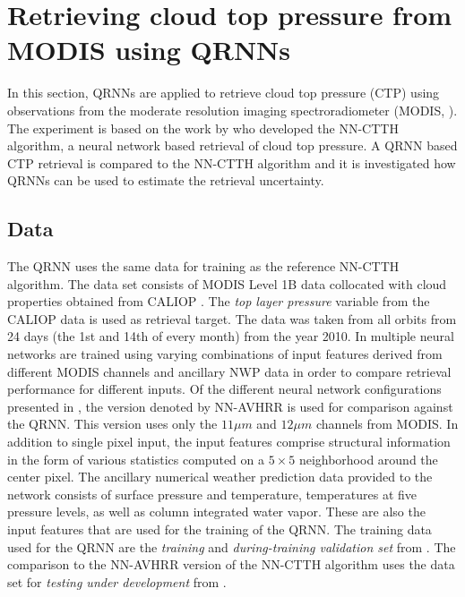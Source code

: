 \documentclass[journal abbreviation, manuscript]{copernicus}
\begin{document}
\section{Retrieving cloud top pressure from MODIS using QRNNs}
\label{sec:ctp}

In this section, QRNNs are applied to retrieve cloud top pressure (CTP) using
observations from the moderate resolution imaging spectroradiometer (MODIS,
\citet{modis}). The experiment is based on the work by \cite{hakansson} who
developed the NN-CTTH algorithm, a neural network based retrieval of cloud top
pressure. A QRNN based CTP retrieval is compared to the NN-CTTH algorithm and it
is investigated how QRNNs can be used to estimate the retrieval uncertainty.

\subsection{Data}

The QRNN uses the same data for training as the reference NN-CTTH algorithm. The
data set consists of MODIS Level 1B data \citep{myd021km, myd03} collocated with
cloud properties obtained from CALIOP \citep{calipso}. The \textit{top layer
  pressure} variable from the CALIOP data is used as retrieval target. The data
was taken from all orbits from 24 days (the 1st and 14th of every month) from
the year 2010. In \citet{hakansson} multiple neural networks are trained using
varying combinations of input features derived from different MODIS channels and
ancillary NWP data in order to compare retrieval performance for different
inputs. Of the different neural network configurations presented in
\citet{hakansson}, the version denoted by NN-AVHRR is used for comparison
against the QRNN. This version uses only the $11 \unit{\mu m}$ and $12\unit{\mu
  m}$ channels from MODIS. In addition to single pixel input, the input features
comprise structural information in the form of various statistics computed on a
$5 \times 5$ neighborhood around the center pixel. The ancillary numerical weather
prediction data provided to the network consists of surface pressure and
temperature, temperatures at five pressure levels, as well as column integrated
water vapor. These are also the input features that are used for the training of
the QRNN. The training data used for the QRNN are the \textit{training} and
\textit{during-training validation set} from \cite{hakansson}. The comparison to
the NN-AVHRR version of the NN-CTTH algorithm uses the data set for
\textit{testing under development} from \cite{hakansson}.
\end{document}
